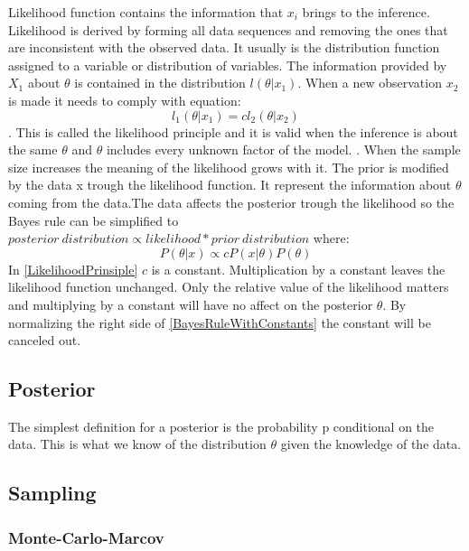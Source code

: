 Likelihood function contains the information that $x_i$ brings to the inference. \cite{Robert2007TheBC} Likelihood is derived by forming all data sequences and removing the ones that are inconsistent with the observed data. It usually is the distribution function assigned to a variable or distribution of variables. \cite{Mcelreath2015StatisticalRA} The information provided by $X_1$ about $\theta$ is contained in the distribution $l(\theta|x_1)$. When a new observation $x_2$ is made it needs to comply with equation:
\begin{equation}\label{LikelihoodPrinsiple}
l_1(\theta|x_1) = cl_2(\theta|x_2)
\end{equation}
\cite{Robert2007TheBC}. This is called the likelihood principle and it is valid when the inference is about the same $\theta$ and $\theta$ includes every unknown factor of the model. \cite{Robert2007TheBC}. When the sample size increases the meaning of the likelihood grows with it. \cite{Mcelreath2015StatisticalRA} The prior is modified by the data x trough the likelihood function. It represent the information about $\theta$ coming from the data.The data affects the posterior trough the likelihood so the Bayes rule can be simplified to $posterior\ distribution \propto likelihood * prior\ distribution$ where: 
\begin{equation}\label{BayesRuleWithConstants}
P(\theta|x) \propto cP(x|\theta)P(\theta)
\end{equation} In \ref{LikelihoodPrinsiple} $c$ is a constant. Multiplication by a constant leaves the likelihood function unchanged. Only the relative value of the likelihood matters and multiplying by a constant will have no affect on the posterior $\theta$. By normalizing the right side of \ref{BayesRuleWithConstants} the constant will be canceled out.\cite{Box1973BayesianII}
 
\subsection{Posterior}\label{Posterior}
The simplest definition for a posterior is the probability p conditional on the data.\cite{Mcelreath2015StatisticalRA} This is what we know of the distribution $\theta$ given the knowledge of the data.\cite{Box1973BayesianII}

\subsection{Sampling}\label{Sampling}
\subsubsection{Monte-Carlo-Marcov}\label{MonteCarloMarcov}
